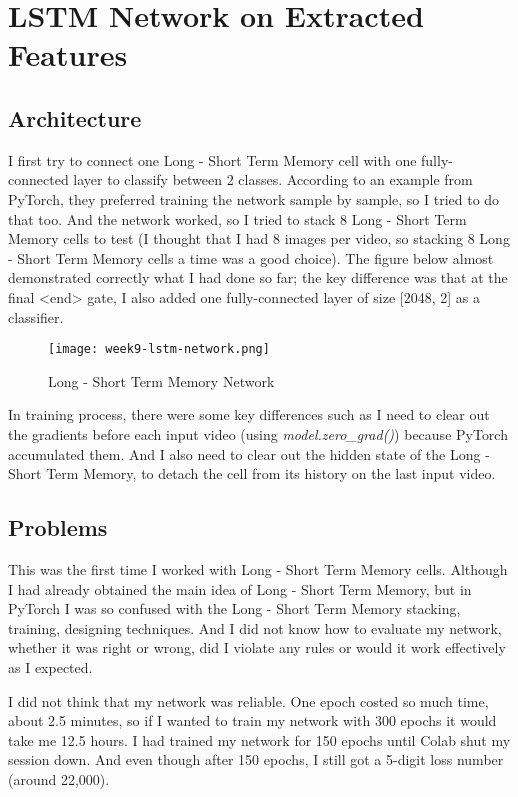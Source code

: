 \section{LSTM Network on Extracted Features}
\subsection{Architecture}
I first try to connect one Long - Short Term Memory\cite{lstm} cell with one fully-connected layer to classify between 2 classes. According to an example from PyTorch, they preferred training the network sample by sample, so I tried to do that too. And the network worked, so I tried to stack 8 Long - Short Term Memory cells to test (I thought that I had 8 images per video, so stacking 8 Long - Short Term Memory cells a time was a good choice). The figure below almost demonstrated correctly what I had done so far; the key difference was that at the final <end> gate, I also added one fully-connected layer of size [2048, 2] as a classifier.

\begin{figure}[!ht]
\centering
\texttt{[image: week9-lstm-network.png]}
\caption{Long - Short Term Memory Network}
\end{figure}

In training process, there were some key differences such as I need to clear out the gradients before each input video (using \emph{model.zero\_grad()}) because PyTorch accumulated them. And I also need to clear out the hidden state of the Long - Short Term Memory, to detach the cell from its history on the last input video.

\subsection{Problems}
This was the first time I worked with Long - Short Term Memory cells. Although I had already obtained the main idea of Long - Short Term Memory, but in PyTorch I was so confused with the Long - Short Term Memory stacking, training, designing techniques. And I did not know how to evaluate my network, whether it was right or wrong, did I violate any rules or would it work effectively as I expected.

I did not think that my network was reliable. One epoch costed so much time, about 2.5 minutes, so if I wanted to train my network with 300 epochs it would take me 12.5 hours. I had trained my network for 150 epochs until Colab shut my session down. And even though after 150 epochs, I still got a 5-digit loss number (around 22,000).
